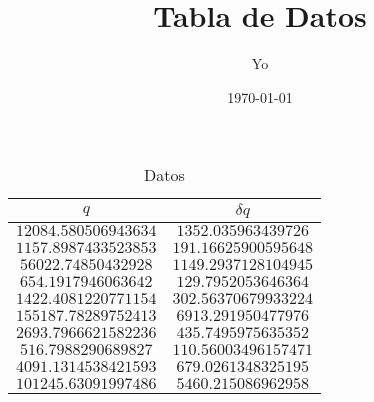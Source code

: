 \documentclass[11pt, spanish, letterpage]{article}
\title{Tabla de Datos}
\author{Yo}\date{\today}
\begin{document}
 
\maketitle 
\begin{table}[H] 
\centering 
\begin{tabular}{||c|c||} 
\hline 
\hline 
$q$ & $\delta q$ \\ 
\hline 
\hline 
$12084.580506943634$ & $1352.035963439726$ \\ 
$1157.8987433523853$ & $191.16625900595648$ \\ 
$56022.74850432928$ & $1149.2937128104945$ \\ 
$654.1917946063642$ & $129.7952053646364$ \\ 
$1422.4081220771154$ & $302.56370679933224$ \\ 
$155187.78289752413$ & $6913.291950477976$ \\ 
$2693.7966621582236$ & $435.7495975635352$ \\ 
$516.7988290689827$ & $110.56003496157471$ \\ 
$4091.1314538421593$ & $679.0261348325195$ \\ 
$101245.63091997486$ & $5460.215086962958$ \\ 
\hline 
\hline 
\end{tabular} 
\caption{Datos} 
\end{table} 
\end{document}
